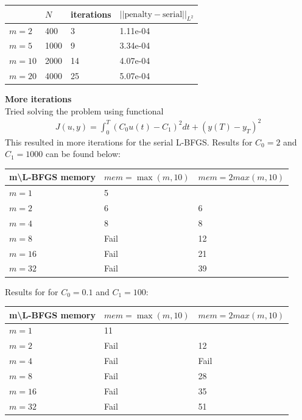 \documentclass[11pt,a4paper]{report}
\begin{document}
\begin{center}
    \begin{tabular}{| l | l | l | l |}
    \hline
     & $N$ & iterations & $||\text{penalty}-\text{serial} ||_{L^2} $  \\ \hline
    $m=2$  &  400 & 3 & 1.11e-04  \\ \hline
    $m=5$  &  1000 &  9&	3.34e-04 \\ \hline
    $m=10$ &  2000 & 14&  4.07e-04\\ \hline
    $m=20$ &  4000 &  25	& 5.07e-04\\ \hline
	\end{tabular}
\end{center} 
\textbf{More iterations}
\\
Tried solving the problem using functional 
\begin{align*}
J(u,y)=\int_0^T (C_0u(t)-C_1)^2dt + (y(T)-y_T)^2
\end{align*}
This resulted in more iterations for the serial L-BFGS. Results for $C_0=2 $ and $C_1= 1000$ can be found below:
\begin{center}
    \begin{tabular}{| l | l | l |}
    \hline
    m\textbackslash L-BFGS memory & $mem =\max(m,10)$& $mem=2max(m,10)$\\ \hline
    $m=1$  &  5 &  \\ \hline
    $m=2$  &  6 &  6	\\ \hline
    $m=4$ &  8 & 8 \\ \hline
    $m=8$ &  Fail &  12	\\ \hline
    $m=16$ &  Fail & 21 \\ \hline
    $m=32$ &  Fail &  39	\\ \hline
    \end{tabular}
\end{center}
Results for for $C_0=0.1 $ and $C_1= 100$:
\begin{center}
    \begin{tabular}{| l | l | l |}
    \hline
    m\textbackslash L-BFGS memory & $mem =\max(m,10)$& $mem=2max(m,10)$\\ \hline
    $m=1$  &  11 &  \\ \hline
    $m=2$  &  Fail &  12	\\ \hline
    $m=4$ &  Fail & Fail \\ \hline
    $m=8$ &  Fail &  28	\\ \hline
    $m=16$ &  Fail & 35 \\ \hline
    $m=32$ &  Fail &  51	\\ \hline
    \end{tabular}
\end{center}
\end{document}
